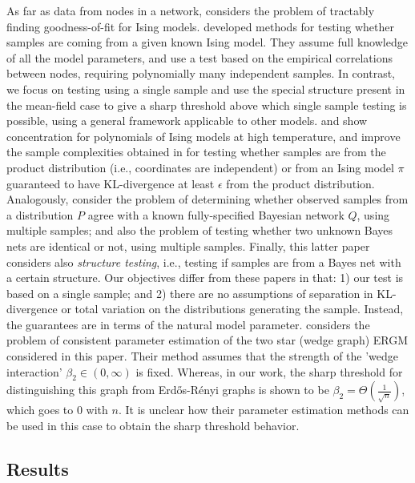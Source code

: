 \documentclass[final,12pt]{colt2018}
\begin{document}
 As far as data from nodes in a network, \citet{martin2017exact} considers the problem of tractably finding goodness-of-fit for Ising models.  \citet{daskalakis2016testing} developed methods for testing whether samples are coming from a given known Ising model. They assume full knowledge of all the model parameters, and use a test based on the empirical correlations between nodes, requiring polynomially many independent samples. In contrast, we focus on testing using a single sample and use the special structure present in the mean-field case to give a sharp threshold above which single sample testing is possible, using a general framework applicable to other models. 
 \cite{daskalakis2017concentration} 
and \cite{gheissari2017concentration} show concentration for polynomials of Ising models at high temperature, and improve the sample complexities obtained in \citet{daskalakis2016testing} for testing whether samples are from the product distribution (i.e., coordinates are independent) or from an Ising model $\pi$ guaranteed to have KL-divergence at least $\epsilon$ from the product distribution. Analogously, \cite{canonne2017testing} consider the problem of determining whether observed samples from a distribution $P$ agree with a known fully-specified Bayesian network $Q$, using multiple samples; and also the problem of testing whether two unknown Bayes nets are identical or not, using multiple samples. Finally, this latter paper considers also \emph{structure testing}, i.e., testing if samples are from a Bayes net with a certain structure. Our objectives differ from these papers in that: 1) our test is based on a single sample; and 2) there are no assumptions of separation in KL-divergence or total variation on the distributions generating the sample. Instead, the guarantees are in terms of the natural model parameter. \citet{mukherjee2013consistent} considers the problem of consistent parameter estimation of the two star (wedge graph) ERGM considered in this paper. Their method assumes that the strength of the 'wedge interaction' $\beta_2 \in (0,\infty)$ is fixed. Whereas, in our work, the sharp threshold for distinguishing this graph from Erd\H{o}s-R\'enyi graphs is shown to be $\beta_2 = \Theta(\frac{1}{\sqrt{n}})$, which goes to $0$ with $n$. It is unclear how their parameter estimation methods can be used in this case to obtain the sharp threshold behavior. 


 \subsection{Results}
 
\end{document}

